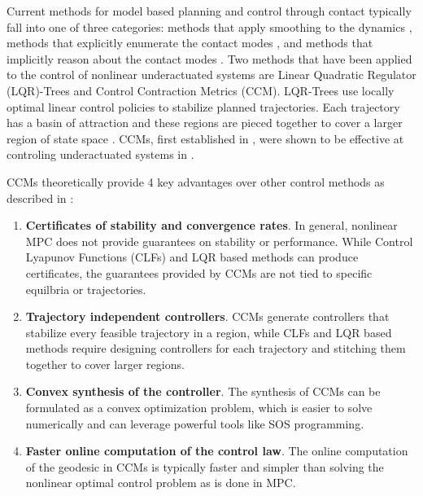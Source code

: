 \documentclass[journal]{IEEEtran}
\begin{document}
Current methods for model based planning and control through contact typically fall into one of three categories: methods that apply smoothing to the dynamics \autocite{stewartOptimalControlSystems2010,pangGlobalPlanningContactRich2023}, methods that explicitly enumerate the contact modes \autocite{hoganFeedbackControlPusherSlider2016}, and methods that implicitly reason about the contact modes \autocite{sleimanContactImplicitTrajectoryOptimization2019,nakatsuruImplicitContactRichManipulation2023,posaDirectMethodTrajectory2014}. Two methods that have been applied to the control of nonlinear underactuated systems are Linear Quadratic Regulator (LQR)-Trees and Control Contraction Metrics (CCM). LQR-Trees use locally optimal linear control policies to stabilize planned trajectories. Each trajectory has a basin of attraction and these regions are pieced together to cover a larger region of state space \autocite{tedrakeLQRtreesFeedbackMotion2010}. CCMs, first established in \autocite{manchesterControlContractionMetrics2017}, were shown to be effective at controling underactuated systems in \autocite{manchesterUnifyingRobotTrajectory2018}.

CCMs theoretically provide 4 key advantages over other control methods as described in \autocite{manchesterControlContractionMetrics2017,manchesterUnifyingRobotTrajectory2018,singhRobustOnlineMotion2017,weiControlContractionMetric2021}:
\begin{enumerate}
	\item {\bf Certificates of stability and convergence rates}. In general, nonlinear MPC does not provide guarantees on stability or performance. While Control Lyapunov Functions (CLFs) and LQR based methods can produce certificates, the guarantees provided by CCMs are not tied to specific equilbria or trajectories.
	\item {\bf Trajectory independent controllers}. CCMs generate controllers that stabilize every feasible trajectory in a region, while CLFs and LQR based methods require designing controllers for each trajectory and stitching them together to cover larger regions.
	\item {\bf Convex synthesis of the controller}. The synthesis of CCMs can be formulated as a convex optimization problem, which is easier to solve numerically and can leverage powerful tools like SOS programming.
	\item {\bf Faster online computation of the control law}. The online computation of the geodesic in CCMs is typically faster and simpler than solving the nonlinear optimal control problem as is done in MPC.
\end{enumerate}
\end{document}
